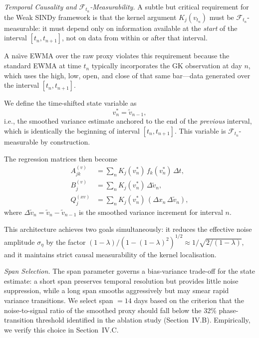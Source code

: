 \documentclass[reprint, amsmath, amssymb, aps, prl, superscriptaddress, nofootinbib]{revtex4-2}
\begin{document}
\textit{Temporal Causality and $\mathcal{F}_{t_n}$-Measurability.}
A subtle but critical requirement for the Weak SINDy framework is that the kernel
argument $K_j(v_{t_n})$ must be $\mathcal{F}_{t_n}$-measurable: it must depend
only on information available at the \emph{start} of the interval $[t_n, t_{n+1}]$,
not on data from within or after that interval.

A na\"{\i}ve EWMA over the raw proxy violates this requirement because the standard
EWMA at time $t_n$ typically incorporates the GK observation at day $n$, which
uses the high, low, open, and close of that same bar---data generated over the interval
$[t_n, t_{n+1}]$.

We define the time-shifted state variable as
\begin{equation}
  v_n^* = \widetilde{v}_{n-1},
\end{equation}
i.e., the smoothed variance estimate anchored to the end of the \emph{previous}
interval, which is identically the beginning of interval $[t_n, t_{n+1}]$.
This variable is $\mathcal{F}_{t_n}$-measurable by construction.

The regression matrices then become
\begin{align}
  A_{jk}^{(v)} &= \sum_{n} K_j(v_n^*)\,f_k(v_n^*)\,\Delta t, \\
  B_j^{(v)} &= \sum_{n} K_j(v_n^*)\,\Delta\widetilde{v}_n, \\
  Q_j^{(xv)} &= \sum_{n} K_j(v_n^*)\,(\Delta x_n\,\Delta\widetilde{v}_n),
\end{align}
where $\Delta\widetilde{v}_n = \widetilde{v}_n - \widetilde{v}_{n-1}$ is the
smoothed variance increment for interval $n$.

This architecture achieves two goals simultaneously: it reduces the effective
noise amplitude $\sigma_\eta$ by the factor $(1-\lambda)/(1-(1-\lambda)^2)^{1/2}
\approx 1/\sqrt{2/(1-\lambda)}$, and it maintains strict causal measurability
of the kernel localisation.

\textit{Span Selection.}
The span parameter governs a bias-variance trade-off for the state estimate:
a short span preserves temporal resolution but provides little noise suppression,
while a long span smooths aggressively but may smear rapid variance transitions.
We select span $= 14$ days based on the criterion that the noise-to-signal ratio
of the smoothed proxy should fall below the 32\% phase-transition threshold identified
in the ablation study (Section~IV.B). Empirically, we verify this choice in Section~IV.C.
\end{document}
